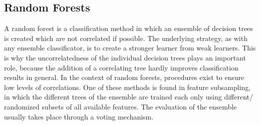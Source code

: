 \subsection{Random Forests}

A random forest is a classification method in which an ensemble of decision trees is created which are not correlated if possible. The underlying strategy, as with any ensemble classificator, is to create a stronger learner from weak learners. This is why the uncorrelatedness of the individual decision trees plays an important role, because the addition of a correlating tree hardly improves classification results in general. In the context of random forests, procedures exist to ensure low levels of correlations. One of these methods is found in feature subsampling, in which the different trees of the ensemble are trained each only using different/ randomized subsets of all available features. The evaluation of the ensemble usually takes place through a voting mechanism. \cite{Jiang}
